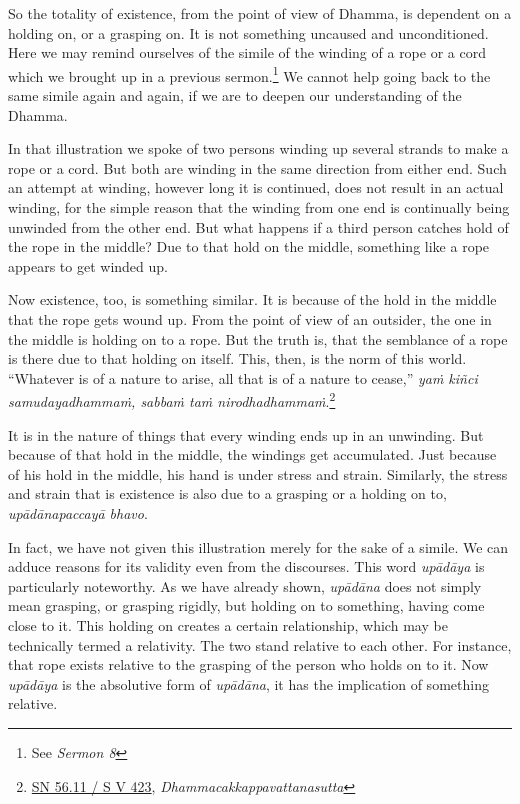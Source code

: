So the totality of existence, from the point of view of Dhamma, is dependent on a holding on, or a grasping on. It is not something uncaused and unconditioned. Here we may remind ourselves of the simile of the winding of a rope or a cord which we brought up in a previous sermon.\footnote{See \emph{Sermon 8}} We cannot help going back to the same simile again and again, if we are to deepen our understanding of the Dhamma.

In that illustration we spoke of two persons winding up several strands to make a rope or a cord. But both are winding in the same direction from either end. Such an attempt at winding, however long it is continued, does not result in an actual winding, for the simple reason that the winding from one end is continually being unwinded from the other end. But what happens if a third person catches hold of the rope in the middle? Due to that hold on the middle, something like a rope appears to get winded up.

Now existence, too, is something similar. It is because of the hold in the middle that the rope gets wound up. From the point of view of an outsider, the one in the middle is holding on to a rope. But the truth is, that the semblance of a rope is there due to that holding on itself. This, then, is the norm of this world. ``Whatever is of a nature to arise, all that is of a nature to cease,'' \emph{yaṁ kiñci samudayadhammaṁ, sabbaṁ taṁ nirodhadhammaṁ}.\footnote{\href{https://suttacentral.net/sn56.11/pli/ms}{SN 56.11 / S V 423}, \emph{Dhammacakkappavattanasutta}}

It is in the nature of things that every winding ends up in an unwinding. But because of that hold in the middle, the windings get accumulated. Just because of his hold in the middle, his hand is under stress and strain. Similarly, the stress and strain that is existence is also due to a grasping or a holding on to, \emph{upādānapaccayā bhavo}.

In fact, we have not given this illustration merely for the sake of a simile. We can adduce reasons for its validity even from the discourses. This word \emph{upādāya} is particularly noteworthy. As we have already shown, \emph{upādāna} does not simply mean grasping, or grasping rigidly, but holding on to something, having come close to it. This holding on creates a certain relationship, which may be technically termed a relativity. The two stand relative to each other. For instance, that rope exists relative to the grasping of the person who holds on to it. Now \emph{upādāya} is the absolutive form of \emph{upādāna}, it has the implication of something relative.

